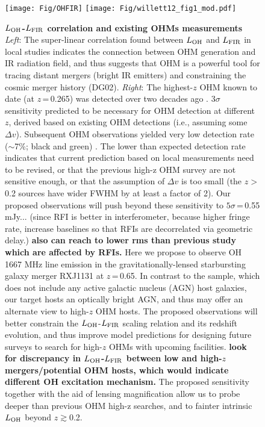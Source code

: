 \documentclass[letterpaper,11pt]{article}
\newcommand{\LFIR}{\mbox{$L_{\rm FIR}$}\xspace}
\newcommand{\LOH}{$L_{\rm OH}$\xspace}
\newcommand{\eq}{\,=\,}
\newcommand{\obs}{observations\xspace}
\begin{document}
\begin{figure}[ptbh]
\texttt{[image: Fig/OHFIR]} \hspace{-1.25em}
\texttt{[image: Fig/willett12\_fig1\_mod.pdf]}
\caption{{\bf \LOH-\LFIR correlation and existing OHMs measurements}
{\it Left}: The super-linear correlation found between \LOH and \LFIR in local studies indicates
the connection between OHM generation and IR radiation field,
and thus suggests that OHM is a powerful tool for tracing distant mergers (bright IR emitters)
and constraining the cosmic merger history (DG02).
{\it Right}: 
The highest-$z$ OHM known to date (at $z$\eq0.265) was 
detected over two decades ago \citep{Baan92a}.
3$\sigma$ sensitivity predicted to be necessary for OHM detection at different $z$, 
derived based on existing OHM detections (i.e., assuming some $\Delta v$). 
Subsequent OHM \obs yielded very low detection rate ($\sim$7\%;  black and green) \citep[figure modified from][]{Willett12a}. 
The lower than expected detection rate indicates that current prediction based on local measurements need to be revised, or that the previous 
high-z OHM survey are not sensitive enough, or that the assumption of $\Delta v$ is too small (the $z$$>$0.2 sources have wider FWHM by at least a factor of 2). 
Our proposed \obs will push beyond these sensitivity to $5\sigma$\eq0.55 mJy...
 (since RFI is better in interferometer, because higher fringe rate, increase baselines so that RFIs are decorrelated via geometric delay.)
{\bf also can reach to lower rms than previous study which are affected by RFIs.}
Here we propose to observe OH 1667 MHz line emission in the gravitationally-lensed starbursting 
galaxy merger RXJ1131 at $z$\eq0.65. 
In contrast to the \citet{Willett12a} sample, which does not include any active galactic nucleus (AGN) host 
galaxies, 
our target hosts an optically bright AGN, and thus may offer an alternate view to high-$z$ OHM hosts. 
The proposed \obs will better constrain the \LOH-\LFIR scaling relation and its redshift evolution, and thus 
improve %
model predictions for designing 
future surveys to search for high-$z$ OHMs with upcoming facilities.
{\bf look for discrepancy in \LOH-\LFIR between low and high-$z$ mergers/potential OHM hosts, which
 would indicate different OH excitation mechanism.} %
The proposed sensitivity together with the aid of lensing magnification 
allow us to probe deeper than previous OHM high-z searches, and to fainter intrinsic \LOH beyond $z$$\gtrsim$0.2.
\label{fig:model}}
\end{figure}
\end{document}
